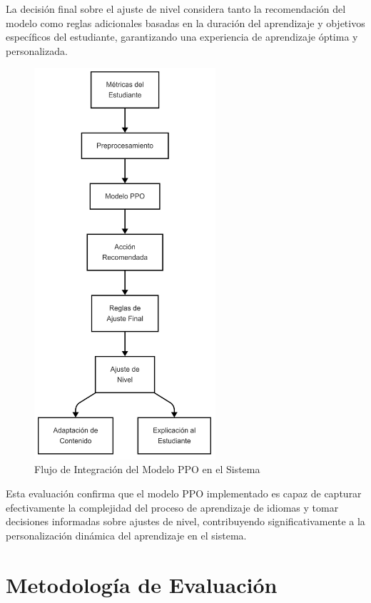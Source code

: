 La decisión final sobre el ajuste de nivel considera tanto la recomendación del modelo como reglas adicionales basadas en la duración del aprendizaje y objetivos específicos del estudiante, garantizando una experiencia de aprendizaje óptima y personalizada.

\begin{figure}[H]
    \centering
    \includegraphics[width=0.6\textwidth]{figuras/ppo-integration.png}
    \caption{Flujo de Integración del Modelo PPO en el Sistema}
    \label{fig:ppo-integration}
\end{figure}

Esta evaluación confirma que el modelo PPO implementado es capaz de capturar efectivamente la complejidad del proceso de aprendizaje de idiomas y tomar decisiones informadas sobre ajustes de nivel, contribuyendo significativamente a la personalización dinámica del aprendizaje en el sistema.

\section{Metodología de Evaluación}
\label{metodologia-evaluacion}

